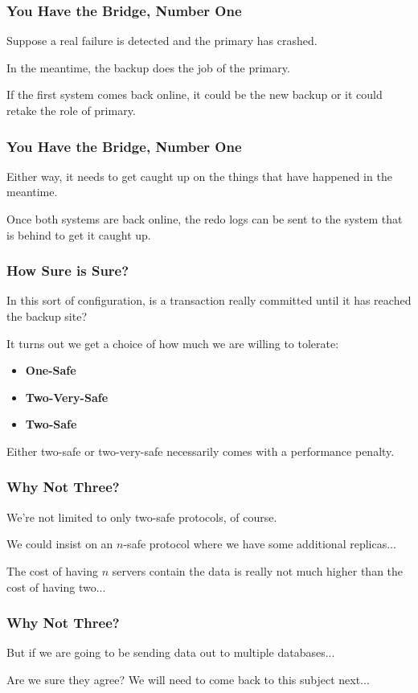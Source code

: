 \begin{frame}
\frametitle{You Have the Bridge, Number One}

Suppose a real failure is detected and the primary has crashed. 

In the meantime, the backup does the job of the primary. 

If the first system comes back online, it could be the new backup or it could retake the role of primary. 

\end{frame}


\begin{frame}
\frametitle{You Have the Bridge, Number One}


Either way, it needs to get caught up on the things that have happened in the meantime. 

Once both systems are back online, the redo logs can be sent to the system that is behind to get it caught up.

\end{frame}

\begin{frame}
\frametitle{How Sure is Sure?}

In this sort of configuration, is a transaction really committed until it has reached the backup site? 

It turns out we get a choice of how much we are willing to tolerate:

\begin{itemize}
	\item \textbf{One-Safe}
	\item \textbf{Two-Very-Safe}
	\item \textbf{Two-Safe}
\end{itemize}


Either two-safe or two-very-safe necessarily comes with a performance penalty.

\end{frame}


\begin{frame}
\frametitle{Why Not Three?}

We're not limited to only two-safe protocols, of course. 

We could insist on an $n$-safe protocol where we have some additional replicas... 

The cost of having $n$ servers contain the data is really not much higher than the cost of having two...


\end{frame}


\begin{frame}
\frametitle{Why Not Three?}

But if we are going to be sending data out to multiple databases... 

Are we sure they agree? We will need to come back to this subject next...


\end{frame}




